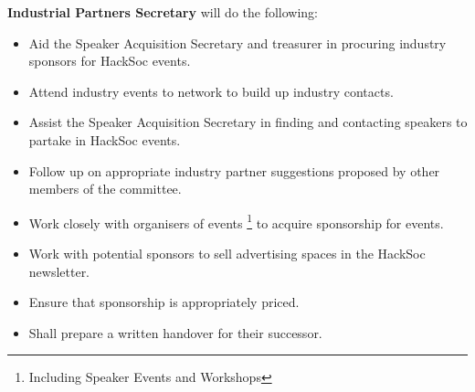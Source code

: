 \begin{subclause}
	\textbf{Industrial Partners Secretary} will do the following:
	\begin{itemize}[label=--,topsep=0em,itemsep=0em]
		\item Aid the Speaker Acquisition Secretary and treasurer in procuring industry sponsors for HackSoc events.
		\item Attend industry events to network to build up industry contacts.
		\item Assist the Speaker Acquisition Secretary in finding and contacting speakers to partake in HackSoc events.
		\item Follow up on appropriate industry partner suggestions proposed by other members of the committee. 
		\item Work closely with organisers of events \footnote{Including Speaker Events and Workshops} to acquire sponsorship for events.
		\item Work with potential sponsors to sell advertising spaces in the HackSoc newsletter.
		\item Ensure that sponsorship is appropriately priced.
		\item Shall prepare a written handover for their successor.
	\end{itemize}
\end{subclause}

